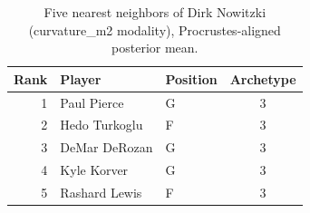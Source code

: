 \begin{table}[htbp]
  \centering\small
  \begin{tabular}{rllc}
    \toprule
    Rank & Player & Position & Archetype \\
    \midrule
    1 & Paul Pierce & G & 3 \\
    2 & Hedo Turkoglu & F & 3 \\
    3 & DeMar DeRozan & G & 3 \\
    4 & Kyle Korver & G & 3 \\
    5 & Rashard Lewis & F & 3 \\
    \bottomrule
  \end{tabular}
  \caption{Five nearest neighbors of Dirk Nowitzki (curvature_m2 modality), Procrustes-aligned posterior mean.}
  \label{tab:Dirk_Nowitzki_neighbors_curvature_m2}
\end{table}

